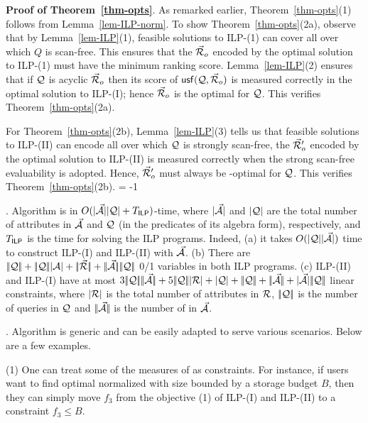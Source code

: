 \vspace{0.8ex}
\noindent
    {\bf Proof of Theorem~\ref{thm-opts}}. As remarked earlier,
    Theorem~\ref{thm-opts}(1) follows from Lemma~\ref{lem-ILP-norm}.
To show  Theorem~\ref{thm-opts}(2a), observe that
by Lemma~\ref{lem-ILP}(1), feasible solutions to ILP-(1) can
cover all \bdss over which $Q$ is scan-free. This ensures that
the \bds $\vec{{\mathcal R}}_{o}$ encoded by the optimal solution to ILP-(1)
must have the minimum ranking score.
Lemma~\ref{lem-ILP}(2) ensures that if $\mathcal Q$ is
acyclic \wrt $\vec{{\mathcal R}}_{o}$ then its score of ${\mathsf{usf}}(\mathcal Q,\allowbreak
\vec{{\mathcal R}}_{o})$ is measured correctly in the optimal solution to
ILP-(I); hence $\vec{{\mathcal R}}_{o}$ is the optimal \bds for $\mathcal Q$. This
verifies Theorem~\ref{thm-opts}(2a).

\vspace{0.6ex}
For Theorem~\ref{thm-opts}(2b),
Lemma~\ref{lem-ILP}(3) tells us that feasible solutions to
ILP-(II) can encode all \bdss over which $\mathcal Q$ is strongly
scan-free, \ie the \bds $\vec{{\mathcal R}}_{o}'$ encoded by the optimal
solution to ILP-(II) is measured correctly
when the strong scan-free evaluability is
adopted. Hence, $\vec{{\mathcal R}}_{o}'$ must always be \ssf-optimal for
$\mathcal Q$. This verifies Theorem~\ref{thm-opts}(2b). \eop
\looseness = -1


. Algorithm \opts is in
$O(|{\vec{{\mathcal A}}}||{\mathcal Q}| + T_{\protect\mathsf{ILP}} )$-time, where
$|{\vec{{\mathcal A}}}|$ and $|{\mathcal Q}|$ are the total number of attributes
in $\vec{{\mathcal A}}$ and $\mathcal Q$ (in the predicates of its algebra form),
respectively, and $T_{\protect\mathsf{ILP}}$ is the time for solving the ILP programs. 
Indeed, %
(a) it takes $O(|{\mathcal Q}||{\vec{{\mathcal A}}}|)$ time to construct ILP-(I) and
ILP-(II) with $\vec{{\mathcal A}}$.
(b) There are $\cdd{\Q} + \cdd{\Q}\cd{\A} + \cdd{\kb{\R}} + \cdd{\kb{\A}}\cdd{\Q}$ 0/1
variables in both ILP programs.
(c) ILP-(II) and ILP-(I) have at most
$3\cdd{\Q}\cdd{\kb{\A}} + 5\cdd{\Q}\cd{\R} + \cd{\Q} +
\cdd{\Q} + \cdd{\kb{\A}} + \cd{\kb{\A}}\cdd{\Q}$ linear
constraints, where $|{{\mathcal R}}|$ is the total number of attributes in
${\mathcal R}$, $|\!|{\mathcal Q}|\!|$ is the number of queries in $\mathcal Q$ and
$|\!|{\vec{{\mathcal A}}}|\!|$ is the number of \bss in $\vec{{\mathcal A}}$. 



. Algorithm \opts is generic and can be easily
adapted to serve various scenarios. Below are a few examples.

\sstab (1) One can treat some of the measures of \opts
as constraints. For instance, if users
want to find optimal normalized \bds with size bounded by a
storage budget $B$, then they can simply move $f_{3}$ from the
objective (1) of ILP-(I) and ILP-(II) to a constraint 
$f_{3}\leq B$.

